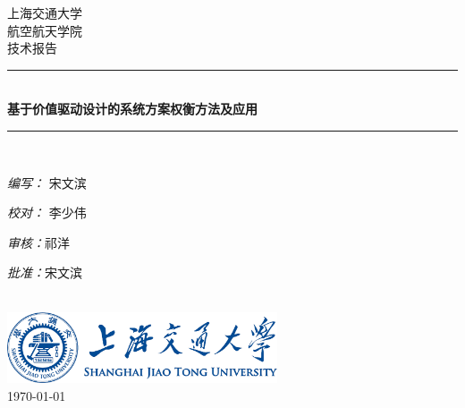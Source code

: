 \documentclass[12pt,a4paper]{report}
\begin{document}
\begin{titlepage}
\newcommand{\HRule}{\rule{\linewidth}{0.1mm}} 
\center %
 
\textsc{\Large 上海交通大学}\\[0.5cm] %
\textsc{\Large 航空航天学院}\\[0.5cm] %
\textsc{\large 技术报告}\\[0.5cm] %
 
\HRule \\[0.4cm]
{ \huge \bfseries 基于价值驱动设计的系统方案权衡方法及应用}\\[0.1cm] %
\HRule \\[1.5cm]
 
 
\begin{minipage}{0.4\textwidth}

\begin{flushleft} \large 
\emph{编写：} 宋文滨\\
\end{flushleft}

\begin{flushleft} \large
\emph{校对：} 李少伟\\
\end{flushleft}

\begin{flushleft} \large
\emph{审核：}祁洋
\end{flushleft} 

\begin{flushleft} \large
\emph{批准：}宋文滨
\end{flushleft} 

\end{minipage}\\[5cm]

\vspace*{\fill}  %
{
\includegraphics[width=0.6\textwidth]{sjtu-logo.eps} \\[1cm]
\large \today}\\[1cm] %
\vfill %
\end{titlepage}
\end{document}
